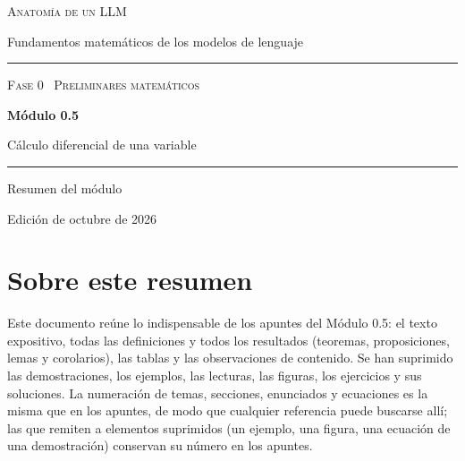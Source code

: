 \documentclass[11pt,a4paper,twoside,openany]{book}
\begin{document}
\frontmatter
\begin{titlepage}
\centering
\vspace*{2.5cm}
{\large\scshape Anatomía de un LLM}\par
\vspace{0.4cm}
{\normalsize Fundamentos matemáticos de los modelos de lenguaje}\par
\vspace{2.2cm}
\rule{\textwidth}{0.8pt}\par\vspace{0.5cm}
{\small\scshape Fase 0 \textperiodcentered\ Preliminares matemáticos}\par\vspace{0.3cm}
{\Huge\bfseries Módulo 0.5\par}\vspace{0.3cm}
{\LARGE Cálculo diferencial de una variable\par}
\vspace{0.5cm}\rule{\textwidth}{0.4pt}\par
\vspace{1.6cm}
{\large Resumen del módulo}\par
\vfill
{\small Edición de octubre de 2026}\par
\end{titlepage}

\chapter*{Sobre este resumen}

Este documento reúne lo indispensable de los apuntes del Módulo 0.5: el texto expositivo, todas las definiciones y todos los resultados (teoremas, proposiciones, lemas y corolarios), las tablas y las observaciones de contenido. Se han suprimido las demostraciones, los ejemplos, las lecturas, las figuras, los ejercicios y sus soluciones. La numeración de temas, secciones, enunciados y ecuaciones es la misma que en los apuntes, de modo que cualquier referencia puede buscarse allí; las que remiten a elementos suprimidos (un ejemplo, una figura, una ecuación de una demostración) conservan su número en los apuntes.
\end{document}
